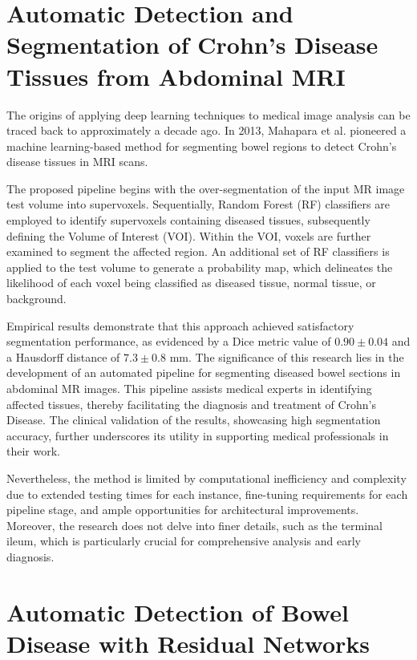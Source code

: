 \section{Automatic Detection and Segmentation of Crohn's Disease Tissues from Abdominal MRI}

The origins of applying deep learning techniques to medical image analysis can be traced back to approximately a decade ago. In 2013, Mahapara et al. \cite{mahapatra2013automatic} pioneered a machine learning-based method for segmenting bowel regions to detect Crohn's disease tissues in MRI scans.

The proposed pipeline begins with the over-segmentation of the input MR image test volume into supervoxels. Sequentially, Random Forest (RF) classifiers are employed to identify supervoxels containing diseased tissues, subsequently defining the Volume of Interest (VOI). Within the VOI, voxels are further examined to segment the affected region. An additional set of RF classifiers is applied to the test volume to generate a probability map, which delineates the likelihood of each voxel being classified as diseased tissue, normal tissue, or background.

Empirical results demonstrate that this approach achieved satisfactory segmentation performance, as evidenced by a Dice metric value of \(0.90 \pm 0.04\) and a Hausdorff distance of \(7.3 \pm 0.8\) mm. The significance of this research lies in the development of an automated pipeline for segmenting diseased bowel sections in abdominal MR images. This pipeline assists medical experts in identifying affected tissues, thereby facilitating the diagnosis and treatment of Crohn's Disease. The clinical validation of the results, showcasing high segmentation accuracy, further underscores its utility in supporting medical professionals in their work.

Nevertheless, the method is limited by computational inefficiency and complexity due to extended testing times for each instance, fine-tuning requirements for each pipeline stage, and ample opportunities for architectural improvements. Moreover, the research does not delve into finer details, such as the terminal ileum, which is particularly crucial for comprehensive analysis and early diagnosis.


\section{Automatic Detection of Bowel Disease with Residual Networks}

